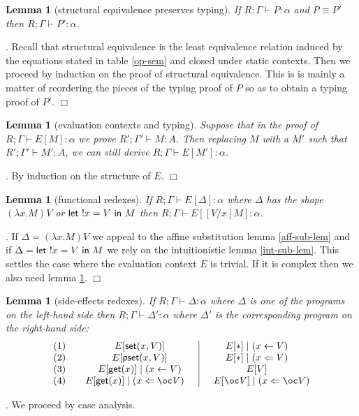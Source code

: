 \documentclass[11pt]{article}
\newtheorem{lemma}[theorem]{Lemma}
\newcommand{\Proof}{\noindent {\sc Proof}. }
\newcommand{\qed}{\hfill${\Box}$}
\newcommand{\Gives}{\vdash}             \newcommand{\IGives}{\vdash_{I}}        \newcommand{\AIGives}{\vdash_{{\it AI}}} \newcommand{\CGives}{\vdash_{C}}
\newcommand{\letm}[3]{{\sf let} \ ! #1 = #2 \ {\sf in} \ #3}    \newcommand{\tertype}{{\bf 1}}
\newcommand{\pst}[2]{{\sf pset}(#1,#2)}
\newcommand{\st}[2]{{\sf set}(#1,#2)}
\newcommand{\get}[1]{{\sf get}(#1)}
\newcommand{\store}[2]{(#1 \leftarrow #2)}
\newcommand{\pstore}[2]{(#1 \Leftarrow #2)}
\begin{document}
\begin{lemma}[structural equivalence preserves typing] \label{sub-red-equ}
If $R;\Gamma\vdash P:\alpha$ and $P\equiv P'$ then $R;\Gamma\vdash P':\alpha$.
\end{lemma}
\Proof
Recall that structural equivalence is the least equivalence
relation induced by the equations stated in 
table \ref{op-sem} and closed under static contexts.
Then we proceed by induction on the proof of structural equivalence.
This is is mainly a matter of reordering the pieces of the typing
proof of $P$ so as to obtain a typing proof of $P'$.
\qed



\begin{lemma}[evaluation contexts and typing]  \label{eva-sub-lem}
Suppose that in the proof of $R;\Gamma \Gives E[M]:\alpha$ 
we prove $R';\Gamma' \Gives M:A$. Then replacing $M$ with a 
$M'$ such that $R';\Gamma'\Gives M':A$, we can still derive
$R;\Gamma \Gives E[M']:\alpha$.
\end{lemma}
\Proof
By induction on the structure of $E$.
\qed


\begin{lemma}[functional redexes]\label{fun-redex}
If $R;\Gamma \Gives E[\Delta] :\alpha$ where 
$\Delta$ has the shape $(\lambda x.M)V$ or $\letm{x}{V}{M}$ then
$R;\Gamma \Gives E[[V/x]M]:\alpha$.
\end{lemma}
\Proof
If $\Delta = (\lambda x.M)V$ we appeal to the affine substitution
lemma \ref{aff-sub-lem} and if $\Delta=\letm{x}{V}{M}$ we rely on the
intuitionistic lemma \ref{int-sub-lem}. This settles the case
where the evaluation context $E$ is trivial. If it is complex
then we also need  lemma \ref{eva-sub-lem}.
\qed


\begin{lemma}[side-effects redexes]\label{side-eff-redex}
If $R;\Gamma \Gives \Delta:\alpha$ where
$\Delta$ is one of the programs on the left-hand
side then $R;\Gamma \Gives \Delta':\alpha$ where
$\Delta'$ is the corresponding program on the right-hand side:
\[
\begin{array}{lc|c}

(1) &E[\st{x}{V}]       &E[*]\mid \store{x}{V} \\
(2) &E[\pst{x}{V}]       &E[*]\mid \pstore{x}{V} \\
(3) &E[\get{x}] \mid \store{x}{V}  &E[V] \\
(4)\quad &E[\get{x}] \mid \pstore{x}{\bang V}  \quad & \quad E[\bang V] \mid \pstore{x}{\bang V}

\end{array}
\]
\end{lemma}
\Proof
We proceed by case analysis.
\end{document}
